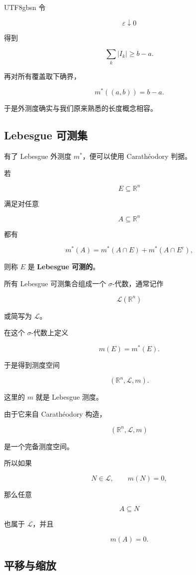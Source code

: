 \documentclass[11pt]{article}
\begin{document}
\begin{CJK*}{UTF8}{gbsn}
令

\[
\varepsilon\downarrow0
\]

得到

\[
\sum_{k}|I_{k}|\geq b-a.
\]

再对所有覆盖取下确界，

\[
m^{*}((a,b))=b-a.
\]

于是外测度确实与我们原来熟悉的长度概念相容。

\subsection{Lebesgue 可测集}

有了 Lebesgue 外测度 $m^{*}$，便可以使用 Carathéodory 判据。

若

\[
E\subseteq\mathbb{R}^{n}
\]

满足对任意

\[
A\subseteq\mathbb{R}^{n}
\]

都有

\[
m^{*}(A)=m^{*}(A\cap E)+m^{*}(A\cap E^{c}),
\]

则称 $E$ 是 \textbf{Lebesgue 可测的}。

所有 Lebesgue 可测集合组成一个 $\sigma$-代数，通常记作

\[
\mathcal{L}(\mathbb{R}^{n})
\]

或简写为 $\mathcal{L}$。

在这个 $\sigma$-代数上定义

\[
m(E)=m^{*}(E).
\]

于是得到测度空间

\[
(\mathbb{R}^{n},\mathcal{L},m).
\]

这里的 $m$ 就是 Lebesgue 测度。

由于它来自 Carathéodory 构造，

\[
(\mathbb{R}^{n},\mathcal{L},m)
\]

是一个完备测度空间。

所以如果

\[
N\in\mathcal{L},\qquad m(N)=0,
\]

那么任意

\[
A\subseteq N
\]

也属于 $\mathcal{L}$，并且

\[
m(A)=0.
\]

\subsection{平移与缩放}


\end{CJK*}
\end{document}
